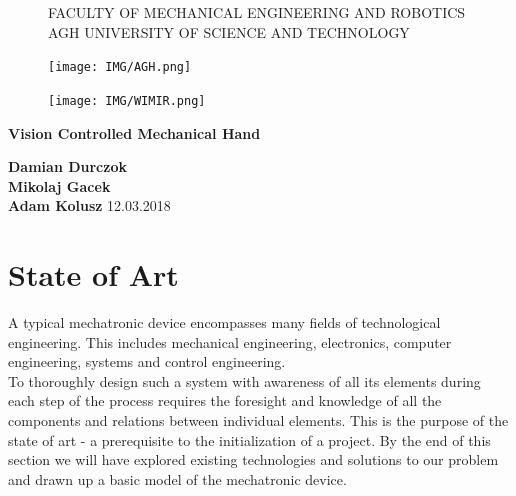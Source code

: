 \documentclass{article}
\begin{document}
\begin{titlepage}
    \begin{center}
        
	\begin{figure}
		\centering
        FACULTY OF MECHANICAL ENGINEERING AND ROBOTICS\\
        AGH UNIVERSITY OF SCIENCE AND TECHNOLOGY\\
        \vspace{0.2cm}
    	\begin{minipage}[b]{0.4\textwidth}
    	    \centering
    		\texttt{[image: IMG/AGH.png]}
    	\end{minipage}
    	\hfill
    	\begin{minipage}[b]{0.4\textwidth}
	    	\centering
    		\texttt{[image: IMG/WIMIR.png]}
		\end{minipage}
		\vspace{1cm}
    \end{figure}

    \Huge \textbf{Vision Controlled Mechanical Hand}
        
    \vspace{0.8cm}
    \LARGE 
    \color{black} 
            
    \vspace{0.8cm}       
    \textbf{Damian Durczok\\Mikolaj Gacek\\Adam Kolusz}        
    \vfill       
    \vspace{0.8cm}    
    12.03.2018
        
    \end{center}
\end{titlepage}

\tableofcontents
\break

\section{State of Art}
A typical mechatronic device encompasses many fields of technological engineering. This includes mechanical engineering, electronics, computer engineering, systems and control engineering.\\[12pt] 
\indent To thoroughly design such a system with awareness of all its elements during each step of the process requires the foresight and knowledge of all the components and relations between individual elements. This is the purpose of the state of art - a prerequisite to the initialization of a project. By the end of this section we will have explored existing technologies and solutions to our problem and drawn up a basic model of the mechatronic device.
\end{document}
